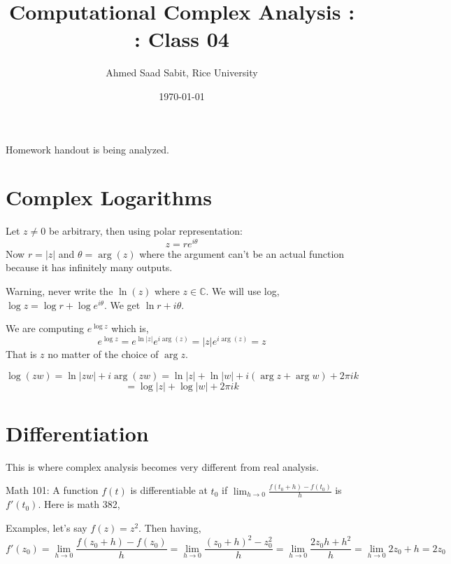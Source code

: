 \documentclass[letter]{article}
\title{Computational Complex Analysis : : Class 04}
\author{Ahmed Saad Sabit, Rice University}
\date{\today}
\begin{document}
\maketitle 

Homework handout is being analyzed. 

\section{Complex Logarithms}
Let $z\neq 0$ be arbitrary, then using polar representation: 
\[
z = r e^{i \theta}
\] 
Now $r = |z|$ and $\theta = \arg(z)$ where the argument can't be an actual function because it has infinitely many outputs.

Warning, never write the $\ln(z)$ where $z \in \mathbb{C}$. We will use log, $\log z = \log r + \log e ^{i\theta}$. We get $\ln r + i \theta$.


We are computing $e^{\log z }$ which is, 
\[
e^{\log z } = e^{\ln |z|} e^{i \arg (z)} = |z| e^{i \arg(z)} = z
\]
That is $z$ no matter of the choice of $\arg z$. 

\[
\log (zw) = \ln |zw| + i \arg(zw) = \ln |z| + \ln|w| + i (\arg z + \arg w) + 2 \pi i k
\] \[
= \log | z| + \log| w| + 2 \pi i k 
\] 

\section{Differentiation} 
This is where complex analysis becomes very different from real analysis. 

Math 101: A function $f(t)$ is differentiable at $t_0$ if $\lim_{h \to 0} \frac{f(t_0 + h) - f(t_0)}{h}$ is $f'(t_0)$. Here is math 382, 


Examples, let's say $f(z) = z^2$. Then having, 
\[
f'(z_0) = \lim_{h \to 0} \frac{f(z_0 + h) - f(z_0)}{h} = \lim_{h \to 0} \frac{(z_0 + h)^2 - z_0^2}{h} = \lim_{h \to 0} \frac{2 z_0 h + h^2}{h} = \lim_{h \to 0}  2z_0 + h = 2 z_0 
\] 		

\end{document}
